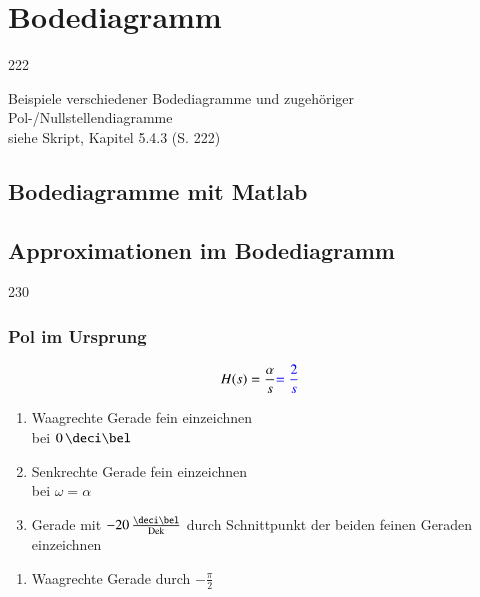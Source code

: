 \section{Bodediagramm}{222}

Beispiele verschiedener Bodediagramme und zugehöriger Pol-/Nullstellendiagramme \\
siehe Skript, Kapitel 5.4.3 (S. 222)


\subsection{Bodediagramme mit Matlab}




\subsection{Approximationen im Bodediagramm}{230}

\subsubsection{Pol im Ursprung}

\begin{minipage}[t]{0.48\columnwidth}
    $$ H(s) = \frac{\alpha}{s} {\color{blue}= \frac{2}{s}} $$
    
\end{minipage}
\hfill
\begin{minipage}[t]{0.48\columnwidth}
        \begin{enumerate}
            \item Waagrechte Gerade fein einzeichnen\\bei $0 \, \deci \bel$
            \item Senkrechte Gerade fein einzeichnen\\bei $\omega = \alpha$
            \item Gerade mit $-20 \, \frac{\deci \bel}{\Dek}$ durch Schnittpunkt der beiden feinen Geraden einzeichnen\\
        \end{enumerate}
    
        \begin{enumerate}
            \item Waagrechte Gerade durch $-\frac{\pi}{2}$
        \end{enumerate}
\end{minipage}


